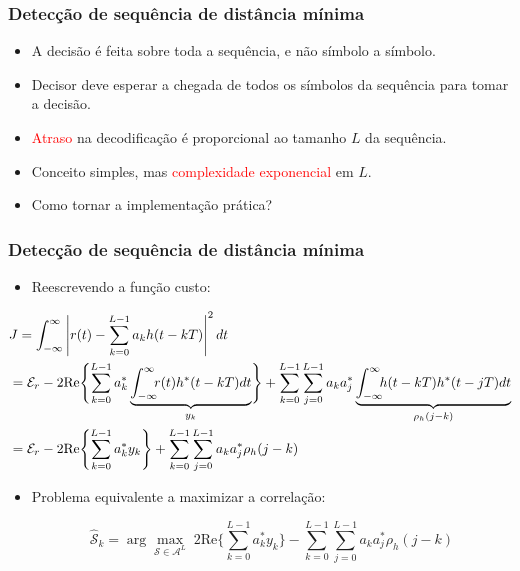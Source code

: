 \begin{frame}
	\frametitle{Detecção de sequência de distância mínima}

	\begin{itemize}
	    \item A decisão é feita sobre toda a sequência, e não símbolo a símbolo.
	    \item Decisor deve esperar a chegada de todos os símbolos da sequência para tomar a decisão.
	    \item \textcolor{red}{Atraso} na decodificação é proporcional ao tamanho $L$ da sequência.
	    \item Conceito simples, mas \textcolor{red}{complexidade exponencial} em $L$.
	    \item Como tornar a implementação prática?
	\end{itemize}	
\end{frame}

\begin{frame}
	\frametitle{Detecção de sequência de distância mínima}

	\begin{itemize}
	    \item Reescrevendo a função custo:
	\end{itemize}	
	\begin{footnotesize}
	\begin{align*}
	    &J = \int_{-\infty}^{\infty} \left| r(t) - \sum_{k=0}^{L-1} a_k h(t-kT) \right|^2 dt \\
	    &= \mathcal{E}_r - 2\mathrm{Re}\Biggl\{ \sum_{k=0}^{L-1} a_k^* \underbrace{\int_{-\infty}^{\infty} \hspace{-0.15cm} r(t)h^*(t-kT) dt}_{y_k} \Biggr\} + \sum_{k=0}^{L-1} \sum_{j=0}^{L-1} a_k a_j^* \underbrace{\int_{-\infty}^{\infty} \hspace{-0.15cm} h(t-kT)h^*(t-jT) dt}_{\rho_h(j-k)} \\
	    &= \mathcal{E}_r - 2\mathrm{Re}\Biggl\{ \sum_{k=0}^{L-1} a_k^* y_k \Biggr\} + \sum_{k=0}^{L-1} \sum_{j=0}^{L-1} a_k a_j^* \rho_h(j-k)
	\end{align*}
	\end{footnotesize}
	\begin{itemize}
	    \item Problema equivalente a maximizar a correlação:
	    \begin{footnotesize}
	    \begin{equation*}
		\hat{\mathcal{S}}_k = \arg \max_{\mathcal{S} \in \mathcal{A}^L} \; 2\mathrm{Re}\Biggl\{ \sum_{k=0}^{L-1} a_k^* y_k \Biggr\} - \sum_{k=0}^{L-1} \sum_{j=0}^{L-1} a_k a_j^* \rho_h(j-k)
	    \end{equation*}
	    \end{footnotesize}
	\end{itemize}	
\end{frame}

